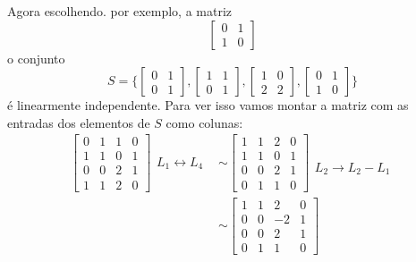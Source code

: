 \begin{exemplos}
\begin{exemplos}
\begin{solucao}
\begin{enumerate}
        Agora escolhendo. por exemplo, a matriz
        \[
          \begin{bmatrix}
            0 & 1\\
            1 & 0
          \end{bmatrix}
        \]
        o conjunto 
        \[
          S = \{\begin{bmatrix}0 & 1\\0 & 1\end{bmatrix}, \begin{bmatrix}1 & 1\\0 & 1\end{bmatrix}, \begin{bmatrix}1 & 0\\2 & 2\end{bmatrix}, \begin{bmatrix}0 & 1\\1 & 0\end{bmatrix}\}
        \]
        é linearmente independente. Para ver isso vamos montar a matriz com as entradas dos elementos de $S$ como colunas:
        \begin{align*}
          \begin{bmatrix}
            0 & 1 & 1 & 0\\
            1 & 1 & 0 & 1\\
            0 & 0 & 2 & 1\\
            1 & 1 & 2 & 0
          \end{bmatrix}
          \begin{array}{l}
            L_1 \leftrightarrow L_4
          \end{array}&\sim
          \begin{bmatrix}
            1 & 1 & 2 & 0\\
            1 & 1 & 0 & 1\\
            0 & 0 & 2 & 1\\
            0 & 1 & 1 & 0
          \end{bmatrix}
          \begin{array}{l}
            \phantom{x}\\L_2 \to L_2 - L_1
          \end{array}\\&\sim
          \begin{bmatrix}
            1 & 1 & 2 & 0\\
            0 & 0 & -2 & 1\\
            0 & 0 & 2 & 1\\
            0 & 1 & 1 & 0

\end{bmatrix}
\end{align*}
\end{enumerate}
\end{solucao}
\end{exemplos}
\end{exemplos}
